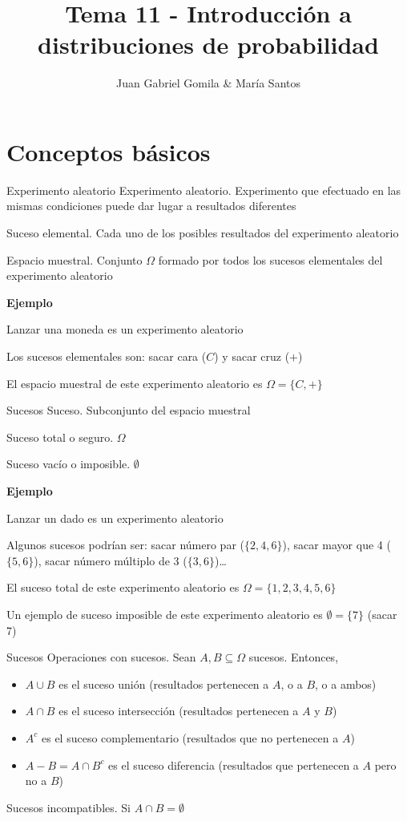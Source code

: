 \documentclass[
  ignorenonframetext,
]{beamer}
\title{Tema 11 - Introducción a distribuciones de probabilidad}
\author{Juan Gabriel Gomila \& María Santos}
\date{}
\providecommand{\tightlist}{%
  \setlength{\itemsep}{0pt}\setlength{\parskip}{0pt}}
\begin{document}
\frame{\titlepage}

\hypertarget{conceptos-buxe1sicos}{%
\section{Conceptos básicos}\label{conceptos-buxe1sicos}}

\begin{frame}{Experimento aleatorio}
\protect\hypertarget{experimento-aleatorio}{}
Experimento aleatorio. Experimento que efectuado en las mismas
condiciones puede dar lugar a resultados diferentes

Suceso elemental. Cada uno de los posibles resultados del experimento
aleatorio

Espacio muestral. Conjunto \(\Omega\) formado por todos los sucesos
elementales del experimento aleatorio

\textbf{Ejemplo}

Lanzar una moneda es un experimento aleatorio

Los sucesos elementales son: sacar cara (\(C\)) y sacar cruz (\(+\))

El espacio muestral de este experimento aleatorio es
\(\Omega = \{C,+\}\)
\end{frame}

\begin{frame}{Sucesos}
\protect\hypertarget{sucesos}{}
Suceso. Subconjunto del espacio muestral

Suceso total o seguro. \(\Omega\)

Suceso vacío o imposible. \(\emptyset\)

\textbf{Ejemplo}

Lanzar un dado es un experimento aleatorio

Algunos sucesos podrían ser: sacar número par (\(\{2,4,6\}\)), sacar
mayor que 4 (\(\{5,6\}\)), sacar número múltiplo de 3
(\(\{3,6\}\))\ldots{}

El suceso total de este experimento aleatorio es
\(\Omega = \{1,2,3,4,5,6\}\)

Un ejemplo de suceso imposible de este experimento aleatorio es
\(\emptyset = \{7\}\) (sacar 7)
\end{frame}

\begin{frame}{Sucesos}
\protect\hypertarget{sucesos-1}{}
Operaciones con sucesos. Sean \(A,B\subseteq \Omega\) sucesos. Entonces,

\begin{itemize}
\tightlist
\item
  \(A\cup B\) es el suceso unión (resultados pertenecen a \(A\), o a
  \(B\), o a ambos)
\item
  \(A\cap B\) es el suceso intersección (resultados pertenecen a \(A\) y
  \(B\))
\item
  \(A^c\) es el suceso complementario (resultados que no pertenecen a
  \(A\))
\item
  \(A-B = A\cap B^c\) es el suceso diferencia (resultados que pertenecen
  a \(A\) pero no a \(B\))
\end{itemize}

Sucesos incompatibles. Si \(A\cap B = \emptyset\)
\end{frame}
\end{document}
